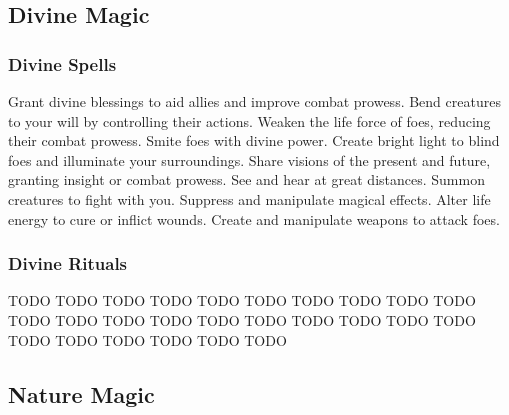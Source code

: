 \small
\subsection{Divine Magic}\label{Divine Magic}
\subsubsection{Divine Spells}\label{Divine Spells}
\begin{spelllist}
 Grant divine blessings to aid allies and improve combat prowess.
 Bend creatures to your will by controlling their actions.
 Weaken the life force of foes, reducing their combat prowess.
 Smite foes with divine power.
 Create bright light to blind foes and illuminate your surroundings.
 Share visions of the present and future, granting insight or combat prowess.
 See and hear at great distances.
 Summon creatures to fight with you.
 Suppress and manipulate magical effects.
 Alter life energy to cure or inflict wounds.
 Create and manipulate weapons to attack foes.
\end{spelllist}
\subsubsection{Divine Rituals}\label{Divine Rituals}
\begin{spelllist}
 TODO
 TODO
 TODO
 TODO
 TODO
 TODO
 TODO
 TODO
 TODO
 TODO
 TODO
 TODO
 TODO
 TODO
 TODO
 TODO
 TODO
 TODO
 TODO
 TODO
 TODO
 TODO
 TODO
 TODO
 TODO
 TODO
\end{spelllist}




\small
\subsection{Nature Magic}\label{Nature Magic}
